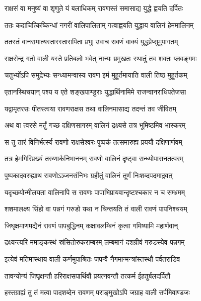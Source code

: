 \twolineshloka
{राक्षसं वा मनुष्यं वा शृणुते यं बलाधिकम्}
{रावणस्तं समासाद्य युद्धे ह्वयति दर्पितः} %

\twolineshloka
{ततः कदाचित्किष्किन्धां नगरीं वालिपालिताम्}
{गत्वाह्वयति युद्धाय वालिनं हेममालिनम्} %

\twolineshloka
{ततस्तं वानरामात्यस्तारस्तारापिता प्रभुः}
{उवाच रावणं वाक्यं युद्धप्रेप्सुमुपागतम्} %

\twolineshloka
{राक्षसेन्द्र गतो वाली यस्ते प्रतिबलो भवेत्}
{नान्यः प्रमुखतः स्थातुं तव शक्तः प्लवङ्गमः} %

\twolineshloka
{चतुर्भ्योऽपि समुद्रेभ्यः सन्ध्यामन्वास्य रावण}
{इमं मुहूर्तमायाति वाली तिष्ठ मुहूर्तकम्} %

\twolineshloka
{एतानस्थिचयान् पश्य य एते शङ्खपाण्डुराः}
{युद्धार्थिनामिमे राजन्वानराधिपतेजसा} %

\twolineshloka
{यद्वामृतरसः पीतस्त्वया रावणराक्षस}
{तथा वालिनमासाद्य तदन्तं तव जीवितम्} %

\twolineshloka
{अथ वा त्वरसे मर्तुं गच्छ दक्षिणसागरम्}
{वालिनं द्रक्ष्यसे तत्र भूमिष्ठमिव भास्करम्} %

\twolineshloka
{स तु तारं विनिर्भर्त्स्य रावणो राक्षसेश्वरः}
{पुष्पकं तत्समारुह्य प्रययौ दक्षिणार्णवम्} %

\twolineshloka
{तत्र हेमगिरिप्रख्यं तरुणार्कनिभाननम्}
{रावणो वालिनं दृष्ट्वा सन्ध्योपासनतत्परम्} %

\twolineshloka
{पुष्पकादवरुह्याथ रावणोऽञ्जनसंनिभः}
{ग्रहीतुं वालिनं तूर्णं निःशब्दपदमाद्रवत्} %

\twolineshloka
{यदृच्छयोन्मीलयता वालिनापि स रावणः}
{पापाभिप्रायवान्दृष्टश्चकार न च सम्भ्रमम्} %

\twolineshloka
{शशमालक्ष्य सिंहो वा पन्नगं गरुडो यथा}
{न चिन्तयति तं वाली रावणं पापनिश्चयम्} %

\twolineshloka
{जिघृक्षमाणमद्यैनं रावणं पापबुद्धिनम्}
{कक्षावलम्बिनं कृत्वा गमिष्यामि महार्णवान्} %

\twolineshloka
{द्रक्ष्यन्त्यरिं ममाङ्कस्थं स्रंसितोरुकराम्बरम्}
{लम्बमानं दशग्रीवं गरुडस्येव पन्नगम्} %

\twolineshloka
{इत्येवं मतिमास्थाय वाली कर्णमुपाश्रितः}
{जपन्वै नैगमान्मन्त्रांस्तस्थौ पर्वतराडिव} %

\twolineshloka
{तावन्योन्यं जिघृक्षन्तौ हरिराक्षसपार्थिवौ}
{प्रयत्नवन्तौ तत्कर्म ईहतुर्बलदर्पितौ} %

\twolineshloka
{हस्तग्राह्यं तु तं मत्वा पादशब्देन रावणम्}
{पराङ्मुखोऽपि जग्राह वाली सर्पमिवाण्डजः} %

